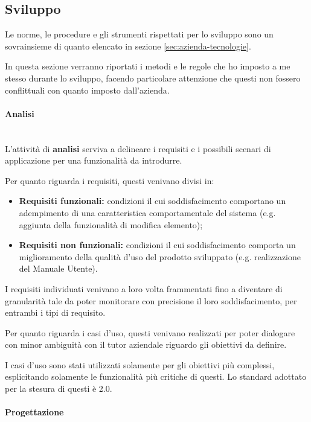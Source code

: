 \subsection{Sviluppo}

Le norme, le procedure e gli strumenti rispettati per lo sviluppo sono un
sovrainsieme di quanto elencato in sezione \ref{sec:azienda-tecnologie}.

In questa sezione verranno riportati i metodi e le regole che ho imposto a me
stesso durante lo sviluppo, facendo particolare attenzione che questi non
fossero conflittuali con quanto imposto dall'azienda.

\paragraph{Analisi} \mbox{} \\

L'attività di \textbf{analisi} serviva a delineare i requisiti e i possibili
scenari di applicazione per una funzionalità da introdurre.

Per quanto riguarda i requisiti, questi venivano divisi in:

\begin{itemize}
\item \textbf{Requisiti funzionali:} condizioni il cui soddisfacimento
  comportano un adempimento di una caratteristica comportamentale del sistema
  (e.g. aggiunta della funzionalità di modifica elemento);
\item \textbf{Requisiti non funzionali:} condizioni il cui soddisfacimento
  comporta un miglioramento della qualità d'uso del prodotto sviluppato (e.g.
  realizzazione del Manuale Utente).
\end{itemize}

I requisiti individuati venivano a loro volta frammentati fino a diventare di
granularità tale da poter monitorare con precisione il loro soddisfacimento,
per entrambi i tipi di requisito.

Per quanto riguarda i casi d'uso, questi venivano realizzati per poter
dialogare con minor ambiguità con il tutor aziendale riguardo gli obiettivi da
definire.

I casi d'uso sono stati utilizzati solamente per gli obiettivi più complessi,
esplicitando solamente le funzionalità più critiche di questi. Lo standard
adottato per la stesura di questi è  2.0.

\paragraph{Progettazione} \mbox{} \\

